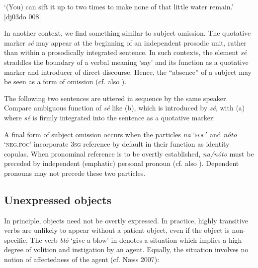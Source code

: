 \glt ‘(You) can sift it up to two times to make none of that little water remain.’ [dj03do 008]
\z

In another context, we find something similar to subject omission. The quotative marker \textit{sé} may appear at the beginning of an independent prosodic unit, rather than within a prosodically integrated sentence. In such contexts, the element \textit{sé} straddles the boundary of a verbal meaning ‘say’ and its function as a quotative marker and introducer of direct discourse. Hence, the “absence” of a subject may be seen as a form of omission (cf. also ).


The following two sentences are uttered in sequence by the same speaker. Compare ambiguous function of \textit{sé} like (b), which is introduced by \textit{sé}, with (a) where \textit{sé} is firmly integrated into the sentence as a quotative marker:



\ea%
    \label{ex:key:1271}
\z\z

A final form of subject omission occurs when the particles \textit{na} ‘\textsc{foc}’ and \textit{nóto} ‘\textsc{neg}.\textsc{foc}’ incorporate \textsc{3sg} reference by default in their function as identity copulas. When pronominal reference is to be overtly established, \textit{na}\textit{\textup{/}}\textit{nóto} must be preceded by independent (emphatic) personal pronoun (cf. also ). Dependent pronouns may not precede these two particles.

\subsection{Unexpressed objects}\label{sec:9.4.2}

In principle, objects need not be overtly expressed. In practice, highly transitive verbs are unlikely to appear without a patient object, even if the object is non-specific. The verb \textit{bló} ‘give a blow’ in  denotes a situation which implies a high degree of volition and instigation by an agent. Equally, the situation involves no notion of affectedness of the agent (cf. Næss 2007):


